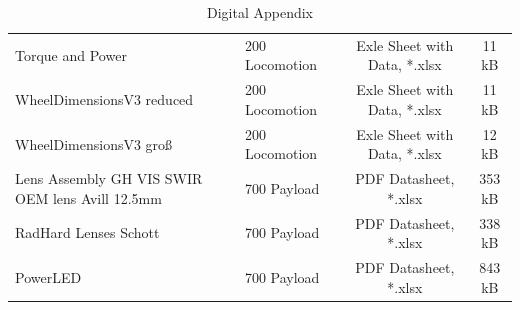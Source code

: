 \begin{table}[htb]
\begin{tabular}{llcc}
		Torque and Power 					& 200 Locomotion\ & Exle Sheet with Data, *.xlsx	& 11 kB  \\
		
		WheelDimensionsV3 reduced			& 200 Locomotion\ & Exle Sheet with Data, *.xlsx	& 11 kB  \\
		
		WheelDimensionsV3 groß				& 200 Locomotion\ & Exle Sheet with Data, *.xlsx	& 12 kB  \\
			
Lens Assembly GH VIS SWIR OEM lens Avill 12.5mm		& 700 Payload\ & PDF Datasheet, *.xlsx	& 353 kB  \\	

RadHard Lenses Schott 					& 700 Payload\ & PDF Datasheet, *.xlsx	& 338 kB  \\	

PowerLED		& 700 Payload\ & PDF Datasheet, *.xlsx	& 843 kB  \\	



		
		

			
			 
		
		 
		 
		 
	\bottomrule
	\end{tabular}
	\caption{Digital Appendix}
	\label{app:DigitalAppendix}
\end{table}

\cleardoublepage